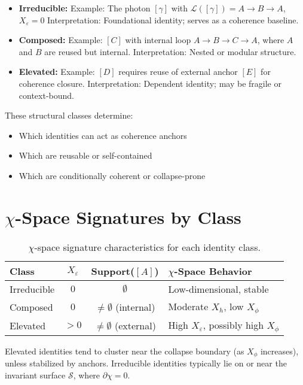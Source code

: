 \begin{itemize}
  \item \textbf{Irreducible:}  
  Example: The photon $[\gamma]$ with $\mathcal{L}([\gamma]) = A \rightarrow B \rightarrow A$, $X_\varepsilon = 0$  
  Interpretation: Foundational identity; serves as a coherence baseline.

  \item \textbf{Composed:}  
  Example: $[C]$ with internal loop $A \rightarrow B \rightarrow C \rightarrow A$, where $A$ and $B$ are reused but internal.  
  Interpretation: Nested or modular structure.

  \item \textbf{Elevated:}  
  Example: $[D]$ requires reuse of external anchor $[E]$ for coherence closure.  
  Interpretation: Dependent identity; may be fragile or context-bound.
\end{itemize}

These structural classes determine:
\begin{itemize}
  \item Which identities can act as coherence anchors
  \item Which are reusable or self-contained
  \item Which are conditionally coherent or collapse-prone
\end{itemize}

\section{$\chi$-Space Signatures by Class} \label{chi-space-signatures-by-class}

\begin{table}[h!]
\centering
\begin{tabular}{l c c l}
\toprule
\textbf{Class} & \textbf{$X_\varepsilon$} & \textbf{Support($[A]$)} & \textbf{$\chi$-Space Behavior} \\
\midrule
Irreducible & $0$ & $\emptyset$ & Low-dimensional, stable \\
Composed    & $0$ & $\ne \emptyset$ (internal) & Moderate $X_h$, low $X_\phi$ \\
Elevated    & $> 0$ & $\ne \emptyset$ (external) & High $X_\varepsilon$, possibly high $X_\phi$ \\
\bottomrule
\end{tabular}
\caption{$\chi$-space signature characteristics for each identity class.}
\end{table}

Elevated identities tend to cluster near the collapse boundary (as $X_\phi$ increases),  
unless stabilized by anchors. Irreducible identities typically lie on or near the invariant surface $\mathcal{S}$,  
where $\partial \chi = 0$.

